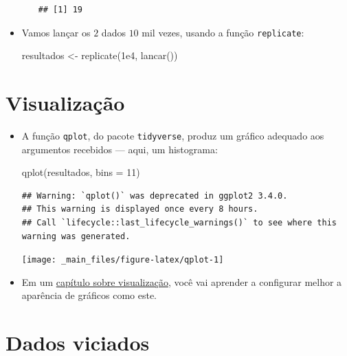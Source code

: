 \documentclass[
  11pt]{report}
\newenvironment{Shaded}{\begin{snugshade}}{\end{snugshade}}
\newcommand{\AttributeTok}[1]{\textcolor[rgb]{0.77,0.63,0.00}{#1}}
\newcommand{\DecValTok}[1]{\textcolor[rgb]{0.00,0.00,0.81}{#1}}
\newcommand{\FloatTok}[1]{\textcolor[rgb]{0.00,0.00,0.81}{#1}}
\newcommand{\FunctionTok}[1]{\textcolor[rgb]{0.00,0.00,0.00}{#1}}
\newcommand{\NormalTok}[1]{#1}
\newcommand{\OtherTok}[1]{\textcolor[rgb]{0.56,0.35,0.01}{#1}}
\renewenvironment{Shaded}{
    \begin{mdframed}[%
      roundcorner=2pt,%
      innerleftmargin=5pt,%
      innerrightmargin=5pt,%
      topline=true,%
      leftline=true,%
      rightline=true,%
      bottomline=true,%
      linewidth=0.5pt,%
      linecolor=black!20,%
      backgroundcolor=black!2,%
      skipabove=2ex,%
      skipbelow=2.5ex%
    ]%
  }
  {
    \end{mdframed}
  }
\begin{document}
\begin{itemize}
\begin{itemize}
\begin{verbatim}
## [1] 19
\end{verbatim}
  \end{itemize}
\item
  Vamos lançar os $2$ dados $10$ mil vezes, usando a função \texttt{replicate}:

\begin{Shaded}
\begin{Highlighting}[]
\NormalTok{resultados }\OtherTok{\textless{}{-}} \FunctionTok{replicate}\NormalTok{(}\FloatTok{1e4}\NormalTok{, }\FunctionTok{lancar}\NormalTok{())}
\end{Highlighting}
\end{Shaded}
\end{itemize}

\hypertarget{visualizauxe7uxe3o}{%
\section{Visualização}\label{visualizauxe7uxe3o}}

\begin{itemize}
\item
  A função \texttt{qplot}, do pacote \texttt{tidyverse}, produz um gráfico adequado aos argumentos recebidos --- aqui, um histograma:

\begin{Shaded}
\begin{Highlighting}[]
\FunctionTok{qplot}\NormalTok{(resultados, }\AttributeTok{bins =} \DecValTok{11}\NormalTok{)}
\end{Highlighting}
\end{Shaded}

\begin{verbatim}
## Warning: `qplot()` was deprecated in ggplot2 3.4.0.
## This warning is displayed once every 8 hours.
## Call `lifecycle::last_lifecycle_warnings()` to see where this warning was generated.
\end{verbatim}

  \begin{center}\texttt{[image: \_main\_files/figure-latex/qplot-1]} \end{center}
\item
  Em um \protect\hyperlink{viz}{capítulo sobre visualização}, você vai aprender a configurar melhor a aparência de gráficos como este.
\end{itemize}

\hypertarget{dados-viciados}{%
\section{Dados viciados}\label{dados-viciados}}
\end{document}
